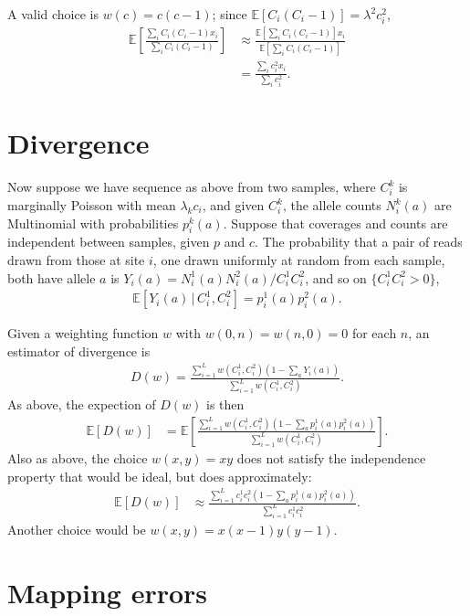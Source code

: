 \documentclass{article}
\newcommand{\E}{\mathbb{E}}
\newcommand{\given}{\,\vert\,}
\begin{document}
A valid choice is $w(c)=c(c-1)$; since $\E[C_i(C_i-1)] = \lambda^2 c_i^2$,
\begin{align}
    \E\left[ \frac{ \sum_i C_i(C_i-1) x_i }{ \sum_i C_i(C_i-1) } \right] 
        &\approx \frac{ \E\left[ \sum_i C_i(C_i-1) \right] x_i }{ \E\left[ \sum_i C_i(C_i-1) \right] } \\
        &= \frac{ \sum_i c_i^2 x_i }{ \sum_i c_i^2 } .
\end{align}


\section*{Divergence}

Now suppose we have sequence as above from two samples,
where $C_i^k$ is marginally Poisson with mean $\lambda_k c_i$,
and given $C_i^k$, the allele counts $N_i^k(a)$ are Multinomial
with probabilities $p_i^k(a)$.
Suppose that coverages and counts are independent between samples, given $p$ and $c$.
The probability that a pair of reads drawn from those at site $i$,
one drawn uniformly at random from each sample,
both have allele $a$ is $Y_i(a) = N_i^1(a) N_i^2(a) / C_i^1 C_i^2$,
and so on $\{C_i^1 C_i^2 > 0\}$,
\begin{align}
    \E[ Y_i(a) \given C_i^1, C_i^2 ]  =  p_i^1(a) p_i^2(a) .
\end{align}

Given a weighting function $w$ with $w(0,n)=w(n,0)=0$ for each $n$,
an estimator of divergence is 
\begin{align}
    D(w) = \frac{ \sum_{i=1}^L w(C_i^1,C_i^2) (1-\sum_a Y_i(a)) }{ \sum_{i=1}^L w(C_i^1,C_i^2) }  .
\end{align}
As above, the expection of $D(w)$ is then
\begin{align}
    \E[ D(w) ]  &= \E\left[ \frac{ \sum_{i=1}^L w(C_i^1,C_i^2) (1-\sum_a p_i^1(a) p_i^2(a)) }{ \sum_{i=1}^L w(C_i^1,C_i^2) } \right]  .
\end{align}
Also as above, the choice $w(x,y) = x y$ does not satisfy the independence property that would be ideal,
but does approximately:
\begin{align}
    \E[ D(w) ]  &\approx \frac{ \sum_{i=1}^L c_i^1 c_i^2  (1-\sum_a p_i^1(a) p_i^2(a)) }{ \sum_{i=1}^L c_i^1 c_i^2 } .
\end{align}
Another choice would be $w(x,y) = x(x-1)y(y-1)$.




\section*{Mapping errors}
\end{document}
